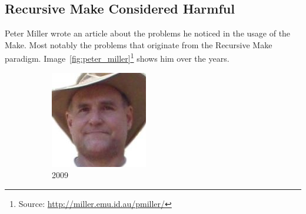 \subsection{Recursive Make Considered Harmful}
\label{sec:recursivemake}
Peter Miller wrote an article about the problems he noticed in the usage of the Make\cite{miller1998recursive}. Most notably the problems that originate from the Recursive Make paradigm.
Image~\ref{fig:peter_miller}\footnote{Source: \url{http://miller.emu.id.au/pmiller/}} shows him over the years.
\begin{figure} \centering
\captionsetup[subfigure]{labelformat=empty}
\begin{subfigure}{0.19\textwidth}
\includegraphics[width=\textwidth]{images/peter_miller_2009.jpg}
\caption{2009}
\end{subfigure}
\begin{subfigure}{0.19\textwidth}

\end{subfigure}
\end{figure}
